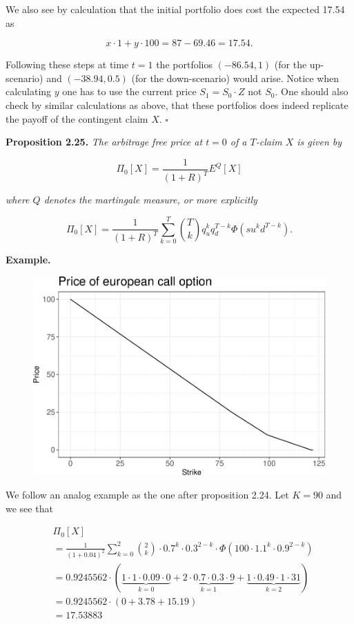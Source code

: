 \documentclass[
]{article}
\begin{document}
We also see by calculation that the initial portfolio does cost the
expected 17.54 as

\[
x\cdot 1+y\cdot100=87-69.46=17.54.
\]

Following these steps at time \(t=1\) the portfolios \((-86.54,1)\) (for
the up-scenario) and \((-38.94,0.5)\) (for the down-scenario) would
arise. Notice when calculating \(y\) one has to use the current price
\(S_1=S_0\cdot Z\) not \(S_0\). One should also check by similar
calculations as above, that these portfolios does indeed replicate the
payoff of the contingent claim \(X\). \(\square\)

\textbf{Proposition 2.25.} \emph{The arbitrage free price at \(t=0\) of
a \(T\)-claim \(X\) is given by}

\[
\Pi_0[X]=\frac{1}{(1+R)^T}E^Q[X]
\]

\emph{where \(Q\) denotes the martingale measure, or more explicitly}

\[
\Pi_0[X]=\frac{1}{(1+R)^T}\sum_{k=0}^T\binom{T}{k}q_u^kq_d^{T-k}\Phi(su^kd^{T-k}).
\]

\textbf{Example.}

\begin{figure}\includegraphics{theory_files/figure-latex/unnamed-chunk-4-1}\end{figure}

We follow an analog example as the one after proposition 2.24. Let
\(K=90\) and we see that

\begin{align*}
&\Pi_0[X]\\
&=\frac{1}{(1+0.04)^2}\sum_{k=0}^2\binom{2}{k}\cdot0.7^k\cdot0.3^{2-k}\cdot\Phi(100\cdot 1.1^k\cdot0.9^{2-k})\\
&=0.9245562\cdot\left(\underbrace{1\cdot 1\cdot0.09\cdot0}_{k=0}+\underbrace{2\cdot 0.7\cdot0.
3\cdot 9}_{k=1}+\underbrace{1\cdot 0.49\cdot1\cdot31}_{k=2}\right)\\
&=0.9245562\cdot\left(0+3.78+15.19\right)\\
&=17.53883
\end{align*}
\end{document}
